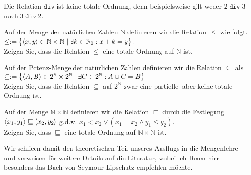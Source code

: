 Die Relation $\mathtt{div}$ ist keine totale Ordnung, denn beispielsweise gilt weder
$2 \mathop{\mathtt{div}} 3$ noch $3 \mathop{\mathtt{div}} 2$.  \exend
\pagebreak

\exercise
Auf der Menge der nat\"{u}rlichen Zahlen $\mathbb{N}$ definieren wir die Relation $\leq$ 
wie folgt: 
\\[0.2cm]
\hspace*{1.3cm}
$\leq := \bigl\{ \pair(x,y) \in \mathbb{N} \times \mathbb{N} \mid \exists k \in \mathbb{N}_0: x + k = y \bigr\}$.
\\[0.2cm]
Zeigen Sie, dass die Relation $\leq$ eine totale Ordnung auf $\mathbb{N}$ ist.
\exend

\exercise
Auf der Potenz-Menge der nat\"{u}rlichen Zahlen definieren wir die Relation
$\subseteq$ als 
\\[0.2cm]
\hspace*{1.3cm}
$\subseteq := 
\bigl\{ \pair(A,B) \in 2^\mathbb{N} \times 2^\mathbb{N}\mid \exists C \in 2^\mathbb{N}: A \cup C = B \bigr\}$
\\[0.2cm]
Zeigen Sie, dass die Relation $\subseteq$ auf $2^\mathbb{N}$ zwar eine partielle, aber keine
totale Ordnung ist.
\exend


\exercise
Auf der Menge $\mathbb{N} \times \mathbb{N}$ definieren wir die Relation $\sqsubseteq$ durch die Festlegung
\\[0.2cm]
\hspace*{1.3cm}
$\pair(x_1, y_1) \sqsubseteq \pair(x_2, y_2)$ \quad g.d.w. \quad 
$x_1 < x_2 \vee (x_1 = x_2 \wedge y_1 \leq y_2)$.  
\\[0.2cm]
Zeigen Sie, dass $\sqsubseteq$ eine totale Ordnung auf $\mathbb{N} \times \mathbb{N}$ ist.
\exend
\vspace*{0.3cm}

\noindent
Wir schlie\3en damit den theoretischen Teil unseres Ausflugs in die Mengenlehre und verweisen f\"{u}r weitere
Details auf die Literatur, wobei ich Ihnen hier besonders das Buch von Seymour Lipschutz
\cite{lipschutz:1998} empfehlen m\"{o}chte.  

